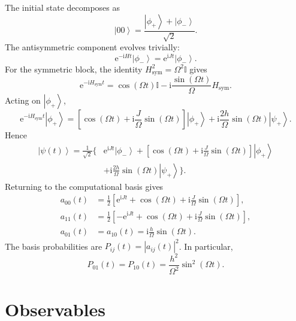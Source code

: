 \documentclass[11pt,a4paper]{article}
\newcommand{\ket}[1]{\left|#1\right\rangle}
\newcommand{\I}{\mathbb{I}}
\newcommand{\e}{\mathrm{e}}
\newcommand{\ii}{\mathrm{i}}
\begin{document}
The initial state decomposes as
\begin{equation}
\ket{00}=\frac{\ket{\phi_+}+\ket{\phi_-}}{\sqrt{2}}.
\end{equation}
The antisymmetric component evolves trivially:
\begin{equation}
\e^{-\ii Ht}\ket{\phi_-}=\e^{\ii Jt}\ket{\phi_-}.
\end{equation}
For the symmetric block, the identity $H_{\mathrm{sym}}^2=\Omega^2\I$ gives
\begin{equation}
\e^{-\ii H_{\mathrm{sym}}t}
=\cos(\Omega t)\I-\ii\frac{\sin(\Omega t)}{\Omega}H_{\mathrm{sym}}.
\end{equation}
Acting on $\ket{\phi_+}$,
\begin{equation}
\e^{-\ii H_{\mathrm{sym}}t}\ket{\phi_+}
=\left[\cos(\Omega t)+\ii\frac{J}{\Omega}\sin(\Omega t)\right]\ket{\phi_+}
+\ii\frac{2h}{\Omega}\sin(\Omega t)\ket{\psi_+}.
\end{equation}
Hence
\begin{align}
\ket{\psi(t)}=
\frac{1}{\sqrt{2}}\Bigg\{&
\e^{\ii Jt}\ket{\phi_-}
+\left[\cos(\Omega t)+\ii\frac{J}{\Omega}\sin(\Omega t)\right]\ket{\phi_+}
\nonumber\\
&+\ii\frac{2h}{\Omega}\sin(\Omega t)\ket{\psi_+}
\Bigg\}.
\end{align}
Returning to the computational basis gives
\begin{equation}
\boxed{
\begin{aligned}
a_{00}(t)&=\frac{1}{2}\left[\e^{\ii Jt}+\cos(\Omega t)+\ii\frac{J}{\Omega}\sin(\Omega t)\right],\\
a_{11}(t)&=\frac{1}{2}\left[-\e^{\ii Jt}+\cos(\Omega t)+\ii\frac{J}{\Omega}\sin(\Omega t)\right],\\
a_{01}(t)&=a_{10}(t)=\ii\frac{h}{\Omega}\sin(\Omega t).
\end{aligned}}
\label{eq:exactamps}
\end{equation}
The basis probabilities are $P_{ij}(t)=|a_{ij}(t)|^2$. In particular,
\begin{equation}
P_{01}(t)=P_{10}(t)=\frac{h^2}{\Omega^2}\sin^2(\Omega t).
\end{equation}

\section{Observables}
\end{document}
